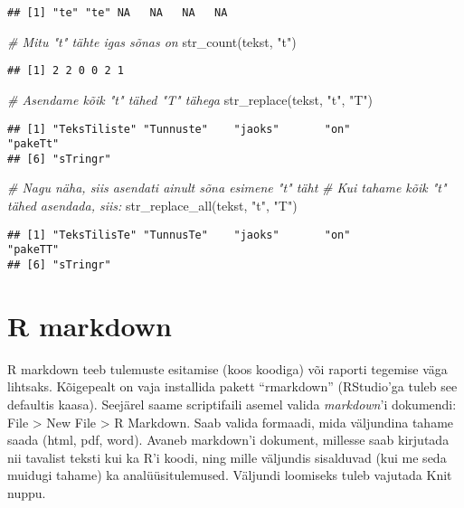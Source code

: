 \documentclass[
]{book}
\newenvironment{Shaded}{\begin{snugshade}}{\end{snugshade}}
\newcommand{\CommentTok}[1]{\textcolor[rgb]{0.56,0.35,0.01}{\textit{#1}}}
\newcommand{\FunctionTok}[1]{\textcolor[rgb]{0.00,0.00,0.00}{#1}}
\newcommand{\NormalTok}[1]{#1}
\newcommand{\StringTok}[1]{\textcolor[rgb]{0.31,0.60,0.02}{#1}}
\begin{document}
\begin{verbatim}
## [1] "te" "te" NA   NA   NA   NA
\end{verbatim}

\begin{Shaded}
\begin{Highlighting}[]
\CommentTok{\# Mitu "t" tähte igas sõnas on}
\FunctionTok{str\_count}\NormalTok{(tekst, }\StringTok{"t"}\NormalTok{)}
\end{Highlighting}
\end{Shaded}

\begin{verbatim}
## [1] 2 2 0 0 2 1
\end{verbatim}

\begin{Shaded}
\begin{Highlighting}[]
\CommentTok{\# Asendame kõik "t" tähed "T" tähega}
\FunctionTok{str\_replace}\NormalTok{(tekst, }\StringTok{"t"}\NormalTok{, }\StringTok{"T"}\NormalTok{)}
\end{Highlighting}
\end{Shaded}

\begin{verbatim}
## [1] "TeksTiliste" "Tunnuste"    "jaoks"       "on"          "pakeTt"     
## [6] "sTringr"
\end{verbatim}

\begin{Shaded}
\begin{Highlighting}[]
\CommentTok{\# Nagu näha, siis asendati ainult sõna esimene "t" täht}
\CommentTok{\# Kui tahame kõik "t" tähed asendada, siis:}
\FunctionTok{str\_replace\_all}\NormalTok{(tekst, }\StringTok{"t"}\NormalTok{, }\StringTok{"T"}\NormalTok{)}
\end{Highlighting}
\end{Shaded}

\begin{verbatim}
## [1] "TeksTilisTe" "TunnusTe"    "jaoks"       "on"          "pakeTT"     
## [6] "sTringr"
\end{verbatim}

\hypertarget{r-markdown}{%
\section{R markdown}\label{r-markdown}}

R markdown teeb tulemuste esitamise (koos koodiga) või raporti tegemise väga lihtsaks. Kõigepealt on vaja installida pakett ``rmarkdown'' (RStudio'ga tuleb see defaultis kaasa). Seejärel saame scriptifaili asemel valida \emph{markdown}'i dokumendi: File \textgreater{} New File \textgreater{} R Markdown. Saab valida formaadi, mida väljundina tahame saada (html, pdf, word). Avaneb markdown'i dokument, millesse saab kirjutada nii tavalist teksti kui ka R'i koodi, ning mille väljundis sisalduvad (kui me seda muidugi tahame) ka analüüsitulemused. Väljundi loomiseks tuleb vajutada Knit nuppu.
\end{document}
